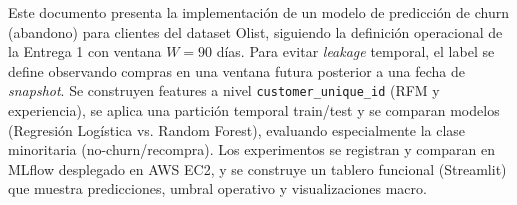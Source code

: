 Este documento presenta la implementación de un modelo de predicción de churn (abandono) para clientes del dataset Olist, siguiendo la definición operacional de la Entrega 1 con ventana $W=90$ días. Para evitar \textit{leakage} temporal, el label se define observando compras en una ventana futura posterior a una fecha de \textit{snapshot}. Se construyen features a nivel \texttt{customer\_unique\_id} (RFM y experiencia), se aplica una partición temporal train/test y se comparan modelos (Regresión Logística vs. Random Forest), evaluando especialmente la clase minoritaria (no-churn/recompra). Los experimentos se registran y comparan en MLflow desplegado en AWS EC2, y se construye un tablero funcional (Streamlit) que muestra predicciones, umbral operativo y visualizaciones macro.